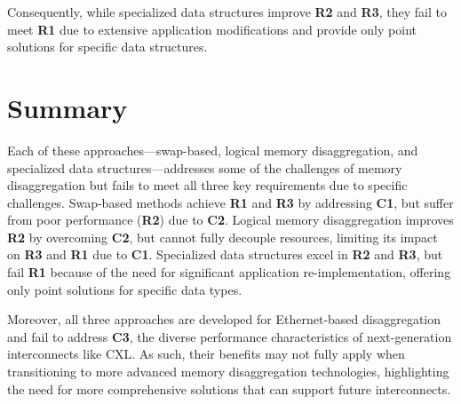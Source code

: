 Consequently, while specialized data structures improve \textbf{R2} and \textbf{R3}, they fail to meet \textbf{R1} due to extensive application modifications and provide only point solutions for specific data structures.

\section{Summary}

Each of these approaches—swap-based, logical memory disaggregation, and specialized data structures—addresses some of the challenges of memory disaggregation but fails to meet all three key requirements due to specific challenges. Swap-based methods achieve \textbf{R1} and \textbf{R3} by addressing \textbf{C1}, but suffer from poor performance (\textbf{R2}) due to \textbf{C2}. Logical memory disaggregation improves \textbf{R2} by overcoming \textbf{C2}, but cannot fully decouple resources, limiting its impact on \textbf{R3} and \textbf{R1} due to \textbf{C1}. Specialized data structures excel in \textbf{R2} and \textbf{R3}, but fail \textbf{R1} because of the need for significant application re-implementation, offering only point solutions for specific data types.

Moreover, all three approaches are developed for Ethernet-based disaggregation and fail to address \textbf{C3}, the diverse performance characteristics of next-generation interconnects like CXL. As such, their benefits may not fully apply when transitioning to more advanced memory disaggregation technologies, highlighting the need for more comprehensive solutions that can support future interconnects.




